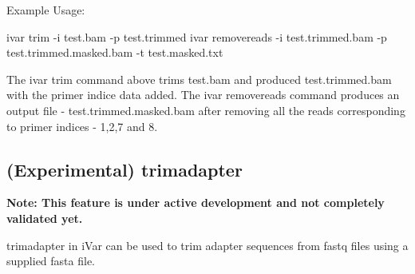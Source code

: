 Example Usage\+: 
\begin{DoxyCode}
ivar trim -i test.bam -p test.trimmed
ivar removereads -i test.trimmed.bam -p test.trimmed.masked.bam -t test.masked.txt
\end{DoxyCode}


The {\ttfamily ivar trim} command above trims test.\+bam and produced test.\+trimmed.\+bam with the primer indice data added. The {\ttfamily ivar removereads} command produces an output file -\/ test.\+trimmed.\+masked.\+bam after removing all the reads corresponding to primer indices -\/ 1,2,7 and 8.\hypertarget{manualpage_autotoc_md20}{}\subsection{(\+Experimental) trimadapter}\label{manualpage_autotoc_md20}
{\bfseries Note\+: This feature is under active development and not completely validated yet.}

trimadapter in i\+Var can be used to trim adapter sequences from fastq files using a supplied fasta file. 